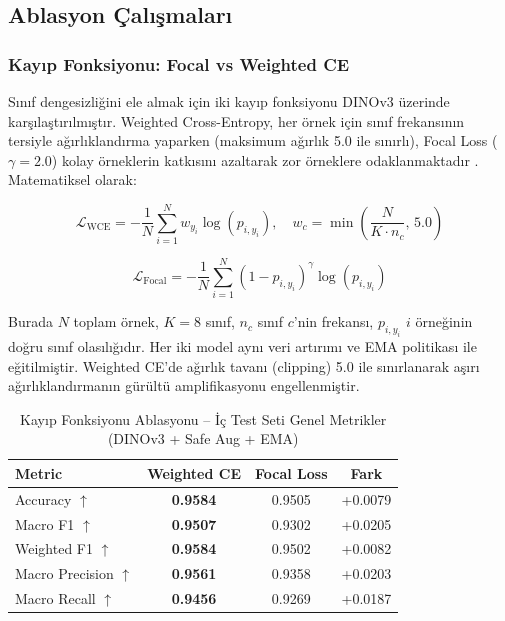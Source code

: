 \documentclass[conference]{IEEEtran}
\begin{document}
\subsection{Ablasyon Çalışmaları}

\subsubsection{Kayıp Fonksiyonu: Focal vs Weighted CE}
Sınıf dengesizliğini ele almak için iki kayıp fonksiyonu DINOv3 üzerinde karşılaştırılmıştır. Weighted Cross-Entropy, her örnek için sınıf frekansının tersiyle ağırlıklandırma yaparken (maksimum ağırlık 5.0 ile sınırlı), Focal Loss ($\gamma=2.0$) kolay örneklerin katkısını azaltarak zor örneklere odaklanmaktadır \cite{lin2017focal}. Matematiksel olarak:

\begin{equation}
\mathcal{L}_{\text{WCE}} = -\frac{1}{N} \sum_{i=1}^{N} w_{y_i} \log(p_{i,y_i}), \quad
w_c = \min\!\left(\frac{N}{K \cdot n_c},\, 5.0\right)
\label{eq:wce}
\end{equation}

\begin{equation}
\mathcal{L}_{\text{Focal}} = -\frac{1}{N} \sum_{i=1}^{N} (1 - p_{i,y_i})^\gamma \log(p_{i,y_i})
\label{eq:focal}
\end{equation}

Burada $N$ toplam örnek, $K=8$ sınıf, $n_c$ sınıf $c$'nin frekansı, $p_{i,y_i}$ $i$ örneğinin doğru sınıf olasılığıdır. Her iki model aynı veri artırımı ve EMA politikası ile eğitilmiştir. Weighted CE'de ağırlık tavanı (clipping) 5.0 ile sınırlanarak aşırı ağırlıklandırmanın gürültü amplifikasyonu engellenmiştir.

\begin{table}[h]
\centering
\caption{Kayıp Fonksiyonu Ablasyonu -- İç Test Seti Genel Metrikler (DINOv3 + Safe Aug + EMA)}
\label{tab:loss_ablation}
\begin{tabular}{@{}lccc@{}}
\toprule
\textbf{Metric} & \textbf{Weighted CE} & \textbf{Focal Loss} & \textbf{Fark} \\ \midrule
Accuracy $\uparrow$ & \textbf{0.9584} & 0.9505 & +0.0079 \\
Macro F1 $\uparrow$ & \textbf{0.9507} & 0.9302 & +0.0205 \\
Weighted F1 $\uparrow$ & \textbf{0.9584} & 0.9502 & +0.0082 \\
Macro Precision $\uparrow$ & \textbf{0.9561} & 0.9358 & +0.0203 \\
Macro Recall $\uparrow$ & \textbf{0.9456} & 0.9269 & +0.0187 \\ \bottomrule
\end{tabular}
\end{table}
\end{document}
